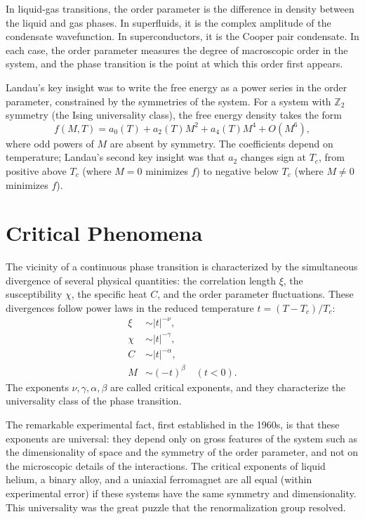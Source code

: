 \documentclass[11pt, twoside, openright]{book}
\theoremstyle{dotted}
\theoremstyle{definition}
\begin{document}
In liquid-gas transitions, the order parameter is the difference in density between
the liquid and gas phases. In superfluids, it is the complex amplitude of the
condensate wavefunction. In superconductors, it is the Cooper pair condensate. In
each case, the order parameter measures the degree of macroscopic order in the
system, and the phase transition is the point at which this order first appears.

Landau's key insight was to write the free energy as a power series in the order
parameter, constrained by the symmetries of the system. For a system with
$\mathbb{Z}_2$ symmetry (the Ising universality class), the free energy density
takes the form
\begin{equation}
  f(M, T) = a_0(T) + a_2(T) M^2 + a_4(T) M^4 + O(M^6),
  \label{eq:landau_free_energy}
\end{equation}
where odd powers of $M$ are absent by symmetry. The coefficients depend on
temperature; Landau's second key insight was that $a_2$ changes sign at $T_c$,
from positive above $T_c$ (where $M=0$ minimizes $f$) to negative below $T_c$
(where $M \neq 0$ minimizes $f$).

\section{Critical Phenomena}
\label{sec:critical_phenomena}

The vicinity of a continuous phase transition is characterized by the simultaneous
divergence of several physical quantities: the correlation length $\xi$, the
susceptibility $\chi$, the specific heat $C$, and the order parameter fluctuations.
These divergences follow power laws in the reduced temperature
$t = (T - T_c)/T_c$:
\begin{align}
  \xi &\sim |t|^{-\nu}, \\
  \chi &\sim |t|^{-\gamma}, \\
  C &\sim |t|^{-\alpha}, \\
  M &\sim (-t)^\beta \quad (t < 0).
\end{align}
The exponents $\nu, \gamma, \alpha, \beta$ are called critical exponents, and
they characterize the universality class of the phase transition.

The remarkable experimental fact, first established in the 1960s, is that these
exponents are universal: they depend only on gross features of the system such as
the dimensionality of space and the symmetry of the order parameter, and not on
the microscopic details of the interactions. The critical exponents of liquid helium,
a binary alloy, and a uniaxial ferromagnet are all equal (within experimental
error) if these systems have the same symmetry and dimensionality. This universality
was the great puzzle that the renormalization group resolved.
\end{document}
